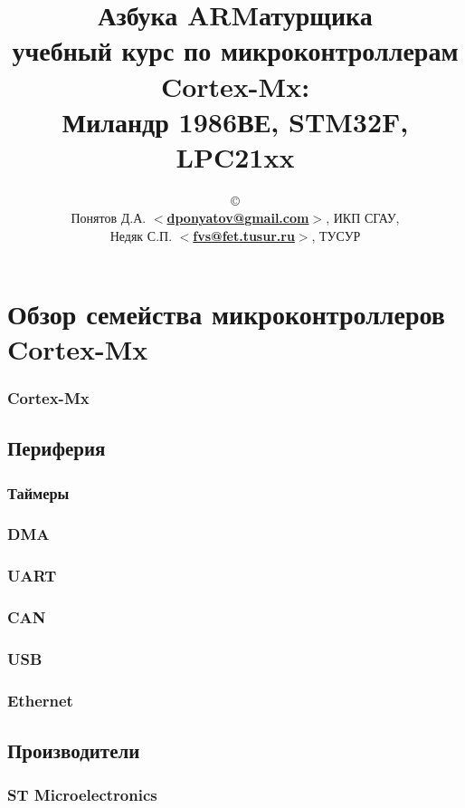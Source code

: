 \documentclass[oneside,12pt]{book}
\newcommand{\cm}[1]{Cortex-M#1}
\newcommand{\cx}{\cm{x}}
\newcommand{\email}[1]{$<$\href{mailto:#1}{\textbf{#1}}$>$}
\begin{document}
\title{\Huge{Азбука ARMатурщика}\\
\normalsize{учебный курс по микроконтроллерам \cx:\\
Миландр 1986ВЕ, STM32F, LPC21xx}}
\author{\copyright\\
Понятов Д.А. \email{dponyatov@gmail.com}, ИКП СГАУ, \\
Недяк С.П. \email{fvs@fet.tusur.ru}, ТУСУР
}
\maketitle
\tableofcontents
\listoflab

\part{Обзор семейства микроконтроллеров \cx}



\section{\cx}
\chapter{Периферия}
\section{Таймеры}
\section{DMA}
\section{UART}
\section{CAN}
\section{USB}
\section{Ethernet}
\chapter{Производители}
\section{ST Microelectronics}
\end{document}
